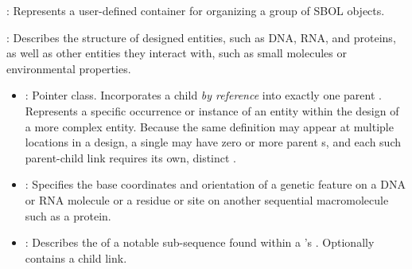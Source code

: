 \begin{description}

\item \emph{}:
Represents a user-defined container for organizing a group of SBOL objects.

\item \emph{}: Describes the structure of designed entities, such as DNA, RNA, and proteins, as well as other entities they interact with, such as small molecules or environmental properties.

\begin{itemize}
\item \emph{}:
Pointer class. Incorporates a child  \textit{by reference} into exactly one parent . Represents a specific occurrence or instance of an entity within the design of a more complex entity. Because the same definition may appear at multiple locations in a design, a single  may have zero or more parent s, and each such parent-child link requires its own, distinct .

\item \emph{}:
Specifies the base coordinates and orientation of a genetic feature on a DNA or RNA molecule or a residue or site on another sequential macromolecule such as a protein.

\item \emph{}:
Describes the  of a notable sub-sequence found within a \newline
{}'s . Optionally contains a child  link.


\end{itemize}
\end{description}
